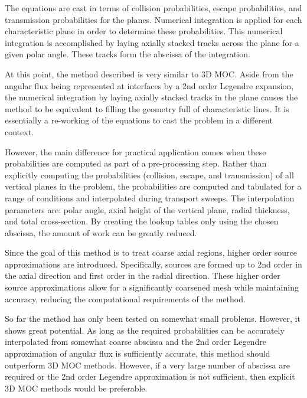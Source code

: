The equations are cast in terms of collision probabilities, escape probabilities, and transmission probabilities for the planes. Numerical integration is applied for each characteristic plane in order to determine these probabilities. This numerical integration is accomplished by laying axially stacked tracks across the plane for a given polar angle. These tracks form the abscissa of the integration. 

At this point, the method described is very similar to 3D \ac{MOC}. Aside from the angular flux being represented at interfaces by a 2nd order Legendre expansion, the numerical integration by laying axially stacked tracks in the plane causes the method to be equivalent to filling the geometry full of characteristic lines. It is essentially a re-working of the equations to cast the problem in a different context.

However, the main difference for practical application comes when these probabilities are computed as part of a pre-processing step. Rather than explicitly computing the probabilities (collision, escape, and transmission) of all vertical planes in the problem, the probabilities are computed and tabulated for a range of conditions and interpolated during transport sweeps. The interpolation parameters are: polar angle, axial height of the vertical plane, radial thickness, and total cross-section. By creating the lookup tables only using the chosen abscissa, the amount of work can be greatly reduced.

Since the goal of this method is to treat coarse axial regions, higher order source approximations are introduced. Specifically, sources are formed up to 2nd order in the axial direction and first order in the radial direction. These higher order source approximations allow for a significantly coarsened mesh while maintaining accuracy, reducing the computational requirements of the method.

So far the method has only been tested on somewhat small problems. However, it shows great potential. As long as the required probabilities can be accurately interpolated from somewhat coarse abscissa and the 2nd order Legendre approximation of angular flux is sufficiently accurate, this method should outperform 3D \ac{MOC} methods. However, if a very large number of abscissa are required or the 2nd order Legendre approximation is not sufficient, then explicit 3D \ac{MOC} methods would be preferable. 


